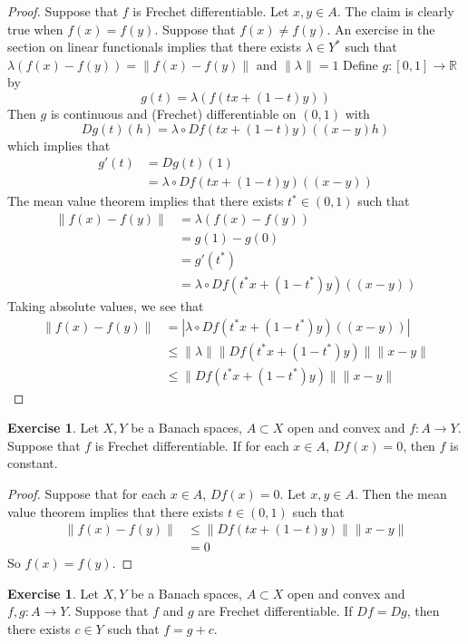 \documentclass[12pt]{amsart}
\theoremstyle{definition}
\newtheorem{ex}[definition]{Exercise}
\newcommand{\lam}{\lambda}
\newcommand{\R}{\mathbb{R}}
\newcommand{\lex}[1]{\label{ex:#1}}
\begin{document}
	\begin{proof}
	Suppose that $f$ is Frechet differentiable. Let $x,y \in A$. The claim is clearly true when $f(x) = f(y)$. Suppose that $f(x) \neq f(y)$. An exercise in the section on linear functionals implies that there exists $\lam \in Y^*$ such that $\lam(f(x)-f(y)) = \| f(x) - f(y)\|$ and $\|\lam \| = 1$
	Define $g:[0,1] \rightarrow \R$ by $$g(t) = \lam(f(tx +(1-t)y))$$ Then $g$ is continuous and (Frechet) differentiable on $(0,1)$ with $$Dg(t)(h) = \lam \circ Df(tx+(1-t)y)((x-y)h)$$ which implies that
	\begin{align*}
	g'(t) 
	&= Dg(t)(1)\\
	&= \lam \circ Df(tx+(1-t)y)((x-y))
	\end{align*}
	The mean value theorem implies that there exists $t^* \in (0,1)$ such that 
	\begin{align*}
	\|f(x) - f(y)\|
	&= \lam(f(x) - f(y)) \\
	&= g(1) - g(0) \\
	&= g'(t^*)\\
	&= \lam \circ Df(t^*x+(1-t^*)y)((x-y))
	\end{align*}
	Taking absolute values, we see that 
	\begin{align*}
	\|f(x) - f(y)\|
	&= |\lam \circ Df(t^*x+(1-t^*)y)((x-y))| \\
	& \leq \|\lam \| \|Df(t^*x+(1-t^*)y)\|\|x-y\| \\
	& \leq \|Df(t^*x+(1-t^*)y)\|\|x-y\|
	\end{align*}
	\end{proof}
	
	\begin{ex} \lex{64004}
	Let $X, Y$ be a Banach spaces, $A \subset X$ open and convex and $f:A \rightarrow Y$. Suppose that $f$ is Frechet differentiable. If for each $x \in A$, $Df(x) = 0$, then $f$ is constant.
	\end{ex}
	
	\begin{proof}
	Suppose that for each $x \in A$, $Df(x) = 0$. Let $x,y \in A$. Then the mean value theorem implies that there exists $t \in (0, 1)$ such that 
	\begin{align*}
	\|f(x) - f(y)\| 
	&\leq \|Df(tx + (1-t)y)\| \|x-y\| \\
	&= 0
	\end{align*}
	So $f(x) = f(y)$. 
	\end{proof}
	
	\begin{ex} \lex{64005}
	Let $X, Y$ be a Banach spaces, $A \subset X$ open and convex and $f,g:A \rightarrow Y$. Suppose that $f$ and $g$ are Frechet differentiable. If $Df = Dg$, then there exists $c \in Y$ such that $f = g+c$.
	\end{ex}
	
\end{document}
